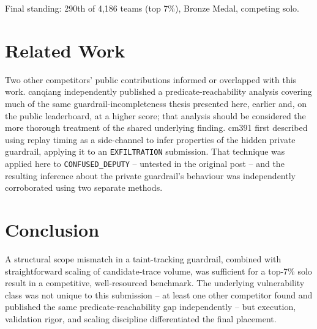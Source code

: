 \documentclass[conference]{IEEEtran}
\begin{document}
Final standing: 290th of 4,186 teams (top 7\%), Bronze Medal, competing
solo.

\section{Related Work}

Two other competitors' public contributions informed or overlapped with
this work. canqiang \cite{canqiang2026} independently published a
predicate-reachability analysis covering much of the same
guardrail-incompleteness thesis presented here, earlier and, on the public
leaderboard, at a higher score; that analysis should be considered the more
thorough treatment of the shared underlying finding.
cm391 \cite{cm392026} first described using replay timing as a side-channel to
infer properties of the hidden private guardrail, applying it to an
\texttt{EXFILTRATION} submission. That technique was applied here to
\texttt{CONFUSED\_DEPUTY} -- untested in the original post -- and the
resulting inference about the private guardrail's behaviour was
independently corroborated using two separate methods.

\section{Conclusion}

A structural scope mismatch in a taint-tracking guardrail, combined with
straightforward scaling of candidate-trace volume, was sufficient for a
top-7\% solo result in a competitive, well-resourced benchmark. The
underlying vulnerability class was not unique to this submission -- at
least one other competitor found and published the same
predicate-reachability gap independently -- but execution, validation
rigor, and scaling discipline differentiated the final placement.
\end{document}
